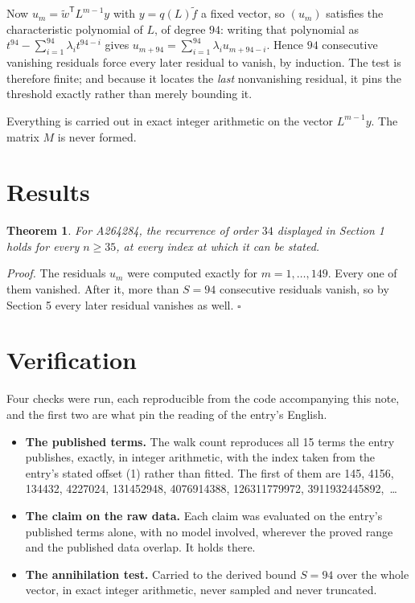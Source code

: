 \documentclass[11pt]{article}
\newtheorem{theorem}{Theorem}
\theoremstyle{definition}
\begin{document}
Now $u_m = \tilde w^{\mathsf T} L^{m-1} y$ with $y = q(L)\tilde f$ a fixed vector, so $(u_m)$ satisfies the characteristic polynomial of $L$, of degree $94$: writing that polynomial as $t^{94} - \sum_{i=1}^{94} \lambda_i t^{94-i}$ gives $u_{m+94} = \sum_{i=1}^{94} \lambda_i u_{m+94-i}$. Hence $94$ consecutive vanishing residuals force every later residual to vanish, by induction. The test is therefore finite; and because it locates the {\itshape last} nonvanishing residual, it pins the threshold exactly rather than merely bounding it.

Everything is carried out in exact integer arithmetic on the vector $L^{m-1}y$. The matrix $M$ is never formed.

\section{Results}

\begin{theorem} For A264284, the recurrence of order $34$ displayed in Section 1 holds for every $n \ge 35$, at every index at which it can be stated.\end{theorem}

{\itshape Proof.} The residuals $u_m$ were computed exactly for $m = 1,\dots,149$. Every one of them vanished. After it, more than $S = 94$ consecutive residuals vanish, so by Section 5 every later residual vanishes as well. $\square$

\section{Verification}

Four checks were run, each reproducible from the code accompanying this note, and the first two are what pin the reading of the entry's English.

\begin{itemize}

\item {\bfseries The published terms.} The walk count reproduces all 15 terms the entry publishes, exactly, in integer arithmetic, with the index taken from the entry's stated offset (1) rather than fitted. The first of them are 145, 4156, 134432, 4227024, 131452948, 4076914388, 126311779972, 3911932445892,~\dots

\item {\bfseries The claim on the raw data.} Each claim was evaluated on the entry's published terms alone, with no model involved, wherever the proved range and the published data overlap. It holds there.

\item {\bfseries The annihilation test.} Carried to the derived bound $S = 94$ over the whole vector, in exact integer arithmetic, never sampled and never truncated.

\end{itemize}
\end{document}
